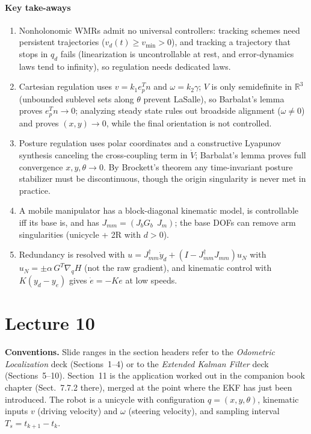 \documentclass[11pt,a4paper]{article}
\def\bm#1{#1}%
\def\boldsymbol#1{#1}%
\newcommand{\R}{\mathbb{R}}
\newcommand{\Gbase}{\bm{G}_b}
\newcommand{\Jbase}{\bm{J}_b}
\newcommand{\Jarm}{\bm{J}_m}
\newcommand{\Jmm}{\bm{J}_{mm}}
\newcommand{\ye}{\bm{y}_e}
\newcommand{\grad}{\nabla_{\!\bm{q}}}
\newcommand{\Ts}{T_s}
\newcommand{\bq}{\boldsymbol{q}}
\theoremstyle{definition}
\theoremstyle{plain}
\theoremstyle{remark}
\begin{document}
\subsection*{Key take-aways}
\begin{enumerate}[leftmargin=*]
\item Nonholonomic WMRs admit no universal controllers: tracking schemes need persistent trajectories ($v_d(t)\ge v_{\min}>0$), and tracking a trajectory that stops in $\bm q_d$ fails (linearization is uncontrollable at rest, and error-dynamics laws tend to infinity), so regulation needs dedicated laws.
\item Cartesian regulation uses $v=k_1\bm e_p^T\bm n$ and $\omega=k_2\gamma$; $V$ is only semidefinite in $\R^3$ (unbounded sublevel sets along $\theta$ prevent LaSalle), so Barbalat's lemma proves $\bm e_p^T\bm n\to0$; analyzing steady state rules out broadside alignment ($\omega\ne0$) and proves $(x,y)\to0$, while the final orientation is not controlled.
\item Posture regulation uses polar coordinates and a constructive Lyapunov synthesis canceling the cross-coupling term in $\dot V$; Barbalat's lemma proves full convergence $x,y,\theta\to0$. By Brockett's theorem any time-invariant posture stabilizer must be discontinuous, though the origin singularity is never met in practice.
\item A mobile manipulator has a block-diagonal kinematic model, is controllable iff its base is, and has $\Jmm=(\Jbase\Gbase\ \ \Jarm)$; the base DOFs can remove arm singularities (unicycle + 2R with $d>0$).
\item Redundancy is resolved with $\bm u=\Jmm^\dagger\dot{\bm y}_d+(\bm I-\Jmm^\dagger\Jmm)\bm u_N$ with $\bm u_N=\pm\alpha\,\bm G^T\grad H$ (not the raw gradient), and kinematic control with $\bm K(\bm y_d-\ye)$ gives $\dot{\bm e}=-\bm K\bm e$ at low speeds.
\end{enumerate}

\newpage

\setcounter{section}{0}
\renewcommand{\thesection}{\arabic{section}}
\part{Lecture 10}

\noindent\textbf{Conventions.} Slide ranges in the section headers refer to the \emph{Odometric
Localization} deck (Sections~1--4) or to the \emph{Extended Kalman Filter} deck (Sections~5--10).
Section~11 is the application worked out in the companion book chapter (Sect.~7.7.2 there), merged
at the point where the EKF has just been introduced. The robot is a unicycle with configuration
$\bq=(x,y,\theta)$, kinematic inputs $v$ (driving velocity) and $\omega$ (steering velocity),
and sampling interval $\Ts=t_{k+1}-t_k$.
\end{document}
